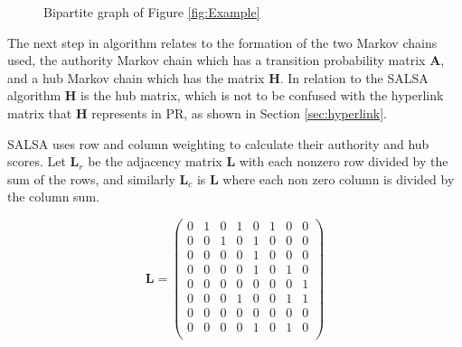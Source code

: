 \documentclass[11pt]{report}
\begin{document}
\begin{figure}[h!]
\centering
{}\caption{Bipartite graph of Figure \ref{fig:Example} } \label{fig:bipartite}
\end{figure}

The next step in algorithm relates to the formation of the two Markov chains used, the authority Markov chain which has a transition probability matrix \textbf{A}, and a hub Markov chain which has the matrix \textbf{H}. In relation to the SALSA algorithm \textbf{H} is the hub matrix, which is not to be confused with the hyperlink matrix that \textbf{H} represents in PR, as shown in Section \ref{sec:hyperlink}.  

SALSA uses row and column weighting to calculate their authority and hub scores. Let $\textbf{L}_r$ be the adjacency matrix \textbf{L} with each nonzero row divided by the sum of the rows, and similarly $\textbf{L}_c$ is \textbf{L} where each non zero column is divided by the column sum.

\begin{equation*}
\textbf{L}=\left(
\begin{array}{cccccccc}
0 & 1 & 0 & 1 & 0 & 1 & 0 & 0 \\
0 & 0 & 1 & 0 & 1 & 0 & 0 & 0 \\
0 & 0 & 0 & 0 & 1 & 0 & 0 & 0 \\
0 & 0 & 0 & 0 & 1 & 0 & 1 & 0 \\
0 & 0 & 0 & 0 & 0 & 0 & 0 & 1 \\
0 & 0 & 0 & 1 & 0 & 0 & 1 & 1 \\
0 & 0 & 0 & 0 & 0 & 0 & 0 & 0 \\
0 & 0 & 0 & 0 & 1 & 0 & 1 & 0 \\
\end{array}
\right)
\end{equation*}
\end{document}
